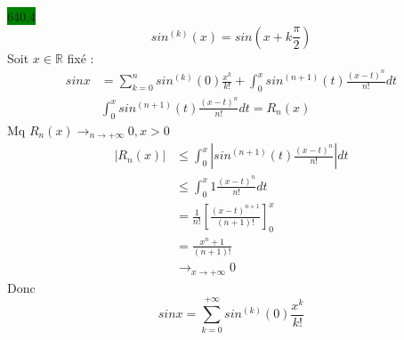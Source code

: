 \documentclass{article}
\begin{document}
\noindent \colorbox{green}{640.4}\\
\begin{equation*}
    sin^{(k)}(x) = sin(x + k\frac{\pi}{2})
\end{equation*}
Soit \(x \in \mathbb{R}\) fixé : \begin{align*}
    sinx &= \sum_{k=0}^{n}sin^{(k)}(0)\frac{x^k}{k!} + \int_{0}^{x}sin^{(n+1)}(t) \frac{(x-t)^n}{n!}dt\\
    &\int_{0}^{x}sin^{(n+1)}(t) \frac{(x-t)^n}{n!}dt = R_n(x)
\end{align*}
Mq \(R_n(x)\rightarrow_{n \to +\infty} 0, x>0\)\begin{align*}
    |R_n(x)| &\leq \int_{0}^{x}|sin^{(n+1)}(t)\frac{(x-t)^n}{n!}|dt\\
    &\leq \int_{0}^{x}1 \frac{(x-t)^n}{n!} dt\\
    &= \frac{1}{n!}[\frac{(x-t)^{n+1}}{(n+1)!}]^x_0\\
    &= \frac{x^n+1}{(n+1)!}\\
    &\rightarrow_{x \to +\infty} 0
\end{align*}
Donc \begin{equation*}
    sinx = \sum_{k=0}^{+\infty} sin^{(k)}(0)\frac{x^k}{k!}
\end{equation*}
\end{document}
